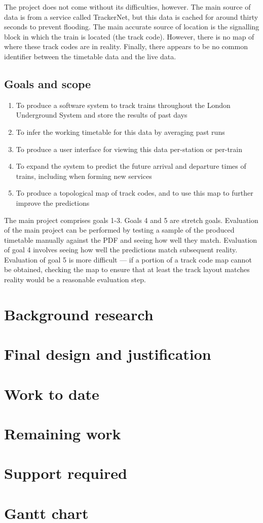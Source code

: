 \documentclass[a4paper,12pt]{article}
\begin{document}
The project does not come without its difficulties, however. The main source of
data is from a service called TrackerNet, but this data is cached for around
thirty seconds to prevent flooding. The main accurate source of location is the
signalling block in which the train is located (the track code).  However,
there is no map of where these track codes are in reality. Finally, there
appears to be no common identifier between the timetable data and the live
data.

\subsection{Goals and scope}

\begin{enumerate}
  \item To produce a software system to track trains throughout the London
    Underground System and store the results of past days
  \item To infer the working timetable for this data by averaging past runs
  \item To produce a user interface for viewing this data per-station or
    per-train
  \item To expand the system to predict the future arrival and departure times
    of trains, including when forming new services
  \item To produce a topological map of track codes, and to use this map to
    further improve the predictions
\end{enumerate}

The main project comprises goals 1-3. Goals 4 and 5 are stretch goals.
Evaluation of the main project can be performed by testing a sample of the
produced timetable manually against the PDF and seeing how well they match.
Evaluation of goal 4 involves seeing how well the predictions match subsequent
reality. Evaluation of goal 5 is more difficult --- if a portion of a track
code map cannot be obtained, checking the map to ensure that at least the track
layout matches reality would be a reasonable evaluation step.

\section{Background research}

\section{Final design and justification}

\section{Work to date}

\section{Remaining work}

\section{Support required}

\section{Gantt chart}




\end{document}
